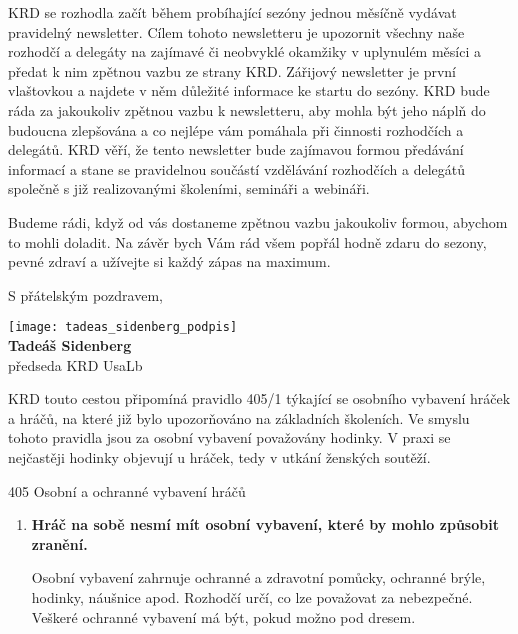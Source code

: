 \documentclass{newsletter}
\begin{document}
KRD se rozhodla začít během probíhající sezóny jednou měsíčně vydávat pravidelný newsletter. Cílem tohoto newsletteru je upozornit všechny naše rozhodčí a delegáty na zajímavé či neobvyklé okamžiky v uplynulém měsíci a předat k nim zpětnou vazbu ze strany KRD. Zářijový newsletter je první vlaštovkou a najdete v něm důležité informace ke startu do sezóny. KRD bude ráda za jakoukoliv zpětnou vazbu k newsletteru, aby mohla být jeho náplň do budoucna zlepšována a co nejlépe vám pomáhala při činnosti rozhodčích a delegátů. KRD věří, že tento newsletter bude zajímavou formou předávání informací a stane se pravidelnou součástí vzdělávání rozhodčích a delegátů společně s již realizovanými školeními, semináři a webináři.

Budeme rádi, když od vás  dostaneme zpětnou vazbu jakoukoliv formou, abychom to mohli doladit. Na závěr bych Vám rád všem popřál hodně zdaru do sezony, pevné zdraví a užívejte si každý zápas na maximum.


S přátelským pozdravem,

\begin{flushleft}
	\vspace{3\baselineskip}
	\texttt{[image: tadeas\_sidenberg\_podpis]}\\
	\textbf{Tadeáš Sidenberg}\\
	předseda KRD UsaLb
\end{flushleft}
\pagebreak

KRD touto cestou připomíná pravidlo 405/1 týkající se osobního vybavení hráček a hráčů, na které již bylo upozorňováno na základních školeních. Ve smyslu tohoto pravidla jsou za osobní vybavení považovány hodinky. V praxi se nejčastěji hodinky objevují u hráček, tedy v utkání ženských soutěží.

\begin{admonition-quote}{405 Osobní a ochranné vybavení hráčů}
	\begin{enumerate}
		\item \textbf{Hráč na sobě nesmí mít osobní vybavení, které by mohlo způsobit zranění.}
		
		\begin{flushleft}
			Osobní vybavení zahrnuje ochranné a zdravotní pomůcky, ochranné brýle, hodinky, náušnice apod. Rozhodčí určí, co lze považovat za nebezpečné. Veškeré ochranné vybavení má být, pokud možno pod dresem.
		\end{flushleft}
	\end{enumerate}
\end{admonition-quote}
\end{document}
